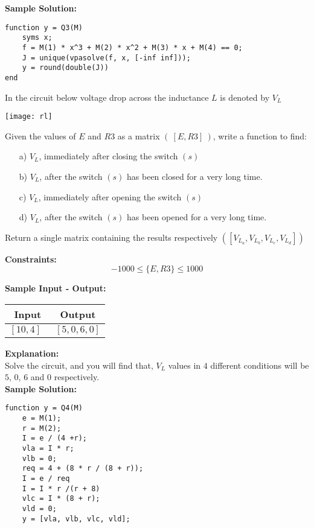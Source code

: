 \documentclass[11pt,paper=a4,answers]{exam}
\begin{document}
\begin{questions}
\textbf{Sample Solution:}\\

\lstset{language=Octave, frame=shadowbox}
\begin{lstlisting}
function y = Q3(M)
    syms x;
    f = M(1) * x^3 + M(2) * x^2 + M(3) * x + M(4) == 0;
    J = unique(vpasolve(f, x, [-inf inf]));
    y = round(double(J))
end
\end{lstlisting}
\droppoints
\newpage
\question[10]
\label{Q:zbus}
In the circuit below voltage drop across the inductance $L$ is denoted by $V_L$\\
\begin{center}
\texttt{[image: rl]}
\end{center}
Given the values of $E$ and $R3$ as a matrix $(\ [E, R3]\ )$, write a function to find:
\begin{enumerate}
\item[a)] $V_L$, immediately after closing the switch $(s)$
\item[b)] $V_L$, after the switch $(s)$ has been closed for a very long time.
\item[c)] $V_L$, immediately after opening the switch $(s)$
\item[d)] $V_L$, after the switch $(s)$ has been opened for a very long time.
\end{enumerate}
Return a single matrix containing the results respectively $([V_{L_a}, V_{L_b}, V_{L_c}, V_{L_d}])$  

\textbf{ Constraints:} 
$$ -1000 \leq \{ E, R3 \} \leq 1000$$

\textbf{ Sample Input - Output:}\\
\begin{center}
\begin{tabular}{|c|c|}
\hline
\textbf{Input} & \textbf{Output}\\
\hline
$[10, 4]\ \ $ & $[5, 0, 6, 0]$ \\
\hline
\end{tabular}
\end{center}

\textbf{Explanation:} \\
Solve the circuit, and you will find that, $V_L$ values in $4$ different conditions will be $5$, $0$, $6$ and $0$ respectively.
\\
\textbf{Sample Solution:}

\lstset{language=Octave, frame=shadowbox}
\begin{lstlisting}
function y = Q4(M)
	e = M(1);
	r = M(2);
	I = e / (4 +r);
	vla = I * r;
	vlb = 0;
	req = 4 + (8 * r / (8 + r));
	I = e / req
	I = I * r /(r + 8)
	vlc = I * (8 + r);
	vld = 0;
	y = [vla, vlb, vlc, vld];
\end{lstlisting}


\end{questions}
\end{document}
